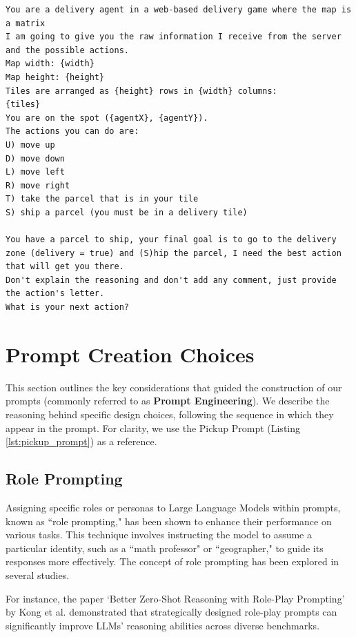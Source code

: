 \begin{codewindow}
  [Text]  \begin{lstlisting}
You are a delivery agent in a web-based delivery game where the map is a matrix
I am going to give you the raw information I receive from the server and the possible actions.
Map width: {width}
Map height: {height}
Tiles are arranged as {height} rows in {width} columns:
{tiles}
You are on the spot ({agentX}, {agentY}).
The actions you can do are:
U) move up
D) move down
L) move left
R) move right
T) take the parcel that is in your tile
S) ship a parcel (you must be in a delivery tile)

You have a parcel to ship, your final goal is to go to the delivery zone (delivery = true) and (S)hip the parcel, I need the best action that will get you there.
Don't explain the reasoning and don't add any comment, just provide the action's letter.
What is your next action?
\end{lstlisting}
\end{codewindow}

\section{Prompt Creation Choices}
\label{sec:prompt_creation_choices}

This section outlines the key considerations that guided the construction of our
prompts (commonly referred to as \textbf{Prompt Engineering}). We describe the reasoning
behind specific design choices, following the sequence in which they appear in
the prompt. For clarity, we use the Pickup Prompt (Listing \ref{lst:pickup_prompt})
as a reference.

\subsection{Role Prompting}
Assigning specific roles or personas to Large Language Models within prompts, known
as ``role prompting," has been shown to enhance their performance on various tasks.
This technique involves instructing the model to assume a particular identity, such
as a ``math professor" or ``geographer," to guide its responses more effectively.
The concept of role prompting has been explored in several studies.

For instance, the paper `Better Zero-Shot Reasoning with Role-Play Prompting' by
Kong et al. \cite{kong2024betterzeroshotreasoningroleplay} demonstrated that strategically
designed role-play prompts can significantly improve LLMs' reasoning abilities
across diverse benchmarks.

